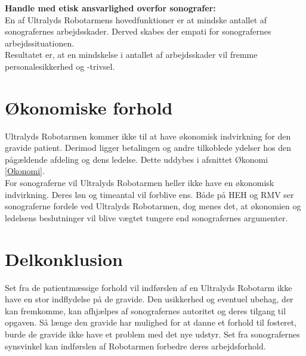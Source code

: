 \textbf{Handle med etisk ansvarlighed overfor sonografer:}\\
En af Ultralyds Robotarmens hovedfunktioner er at mindske antallet af sonografernes arbejdsskader. Derved skabes der empati for sonografernes arbejdssituationen.\\
Resultatet er, at en mindskelse i antallet af arbejdsskader vil fremme personalesikkerhed og -trivsel.   		

\section{Økonomiske forhold}
Ultralyds Robotarmen kommer ikke til at have økonomisk indvirkning for den gravide patient. Derimod ligger betalingen og andre tilkoblede ydelser hos den pågældende afdeling og dens ledelse. Dette uddybes i afsnittet Økonomi \ref{Okonomi}. \\
For sonograferne vil Ultralyds Robotarmen heller ikke have en økonomisk indvirkning. Deres løn og timeantal vil forblive ens. 
Både på HEH og RMV ser sonograferne fordele ved Ultralyds Robotarmen, dog menes det, at økonomien og ledelsens beslutninger vil blive vægtet tungere end sonografernes argumenter.  
 
\section{Delkonklusion }
Set fra de patientmæssige forhold vil indførslen af en Ultralyds Robotarm ikke have en stor indflydelse på de gravide. Den usikkerhed og eventuel ubehag, der kan fremkomme, kan afhjælpes af sonografernes autoritet og deres tilgang til opgaven. Så længe den gravide har mulighed for at danne et forhold til fosteret, burde de gravide ikke have et problem med det nye udstyr. 
Set fra sonografernes synsvinkel kan indførslen af Robotarmen forbedre deres arbejdsforhold. 